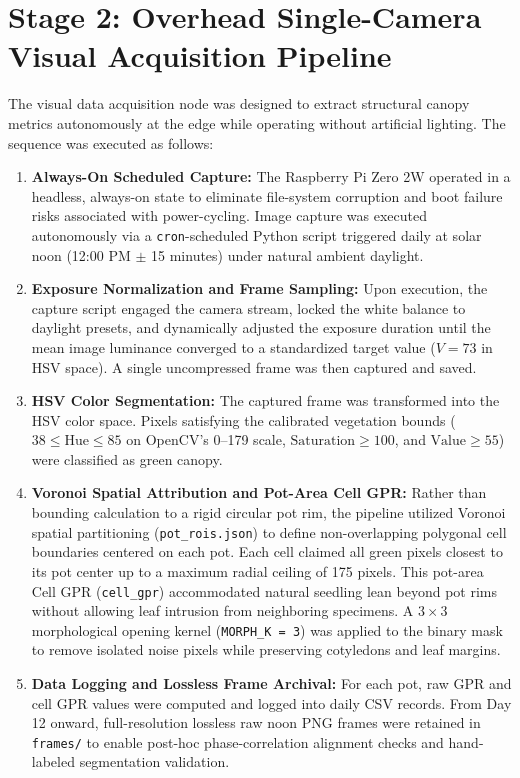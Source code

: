 \section{Stage 2: Overhead Single-Camera Visual Acquisition Pipeline}

The visual data acquisition node was designed to extract structural canopy metrics autonomously at the edge while operating without artificial lighting. The sequence was executed as follows:

\begin{enumerate}
    \item \textbf{Always-On Scheduled Capture:} The Raspberry Pi Zero 2W operated in a headless, always-on state to eliminate file-system corruption and boot failure risks associated with power-cycling. Image capture was executed autonomously via a \texttt{cron}-scheduled Python script triggered daily at solar noon (12:00 PM $\pm$ 15 minutes) under natural ambient daylight.
    \item \textbf{Exposure Normalization and Frame Sampling:} Upon execution, the capture script engaged the camera stream, locked the white balance to daylight presets, and dynamically adjusted the exposure duration until the mean image luminance converged to a standardized target value ($V = 73$ in HSV space). A single uncompressed frame was then captured and saved.
    \item \textbf{HSV Color Segmentation:} The captured frame was transformed into the HSV color space. Pixels satisfying the calibrated vegetation bounds ($38 \le \text{Hue} \le 85$ on OpenCV's 0--179 scale, $\text{Saturation} \ge 100$, and $\text{Value} \ge 55$) were classified as green canopy.
    \item \textbf{Voronoi Spatial Attribution and Pot-Area Cell GPR:} Rather than bounding calculation to a rigid circular pot rim, the pipeline utilized Voronoi spatial partitioning (\texttt{pot\_rois.json}) to define non-overlapping polygonal cell boundaries centered on each pot. Each cell claimed all green pixels closest to its pot center up to a maximum radial ceiling of 175 pixels. This pot-area Cell GPR (\texttt{cell\_gpr}) accommodated natural seedling lean beyond pot rims without allowing leaf intrusion from neighboring specimens. A $3 \times 3$ morphological opening kernel (\texttt{MORPH\_K = 3}) was applied to the binary mask to remove isolated noise pixels while preserving cotyledons and leaf margins.
    \item \textbf{Data Logging and Lossless Frame Archival:} For each pot, raw GPR and cell GPR values were computed and logged into daily CSV records. From Day 12 onward, full-resolution lossless raw noon PNG frames were retained in \texttt{frames/} to enable post-hoc phase-correlation alignment checks and hand-labeled segmentation validation.
\end{enumerate}

